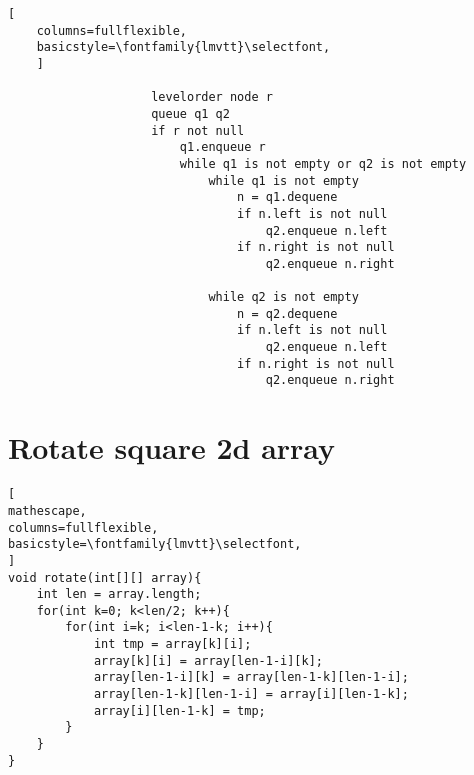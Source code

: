 \documentclass{article}
\begin{document}
\begin{lstlisting}[
    columns=fullflexible,
    basicstyle=\fontfamily{lmvtt}\selectfont,
    ]
        
                    levelorder node r
                    queue q1 q2
                    if r not null
                        q1.enqueue r
                        while q1 is not empty or q2 is not empty
                            while q1 is not empty
                                n = q1.dequene
                                if n.left is not null
                                    q2.enqueue n.left
                                if n.right is not null
                                    q2.enqueue n.right

                            while q2 is not empty
                                n = q2.dequene
                                if n.left is not null
                                    q2.enqueue n.left
                                if n.right is not null
                                    q2.enqueue n.right

\end{lstlisting} 


\section{Rotate square 2d array}
\begin{lstlisting}[
mathescape,
columns=fullflexible,
basicstyle=\fontfamily{lmvtt}\selectfont,
]
void rotate(int[][] array){
    int len = array.length;
    for(int k=0; k<len/2; k++){
        for(int i=k; i<len-1-k; i++){
            int tmp = array[k][i];
            array[k][i] = array[len-1-i][k];
            array[len-1-i][k] = array[len-1-k][len-1-i];
            array[len-1-k][len-1-i] = array[i][len-1-k];
            array[i][len-1-k] = tmp;
        }
    }
}
\end{lstlisting} 
\end{document}
